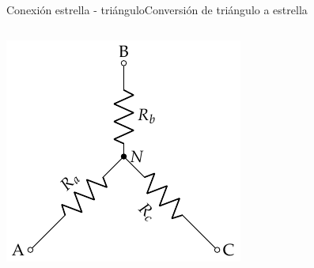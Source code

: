\documentclass[aspectratio=169, xcolor={usenames,svgnames,dvipsnames}]{beamer}
\begin{document}
\begin{frame}{Conexión estrella - triángulo}{Conversión de triángulo a estrella}
\begin{columns}
\begin{column}{0.3\columnwidth}
\begin{center}
\includegraphics[width=.9\linewidth]{../figs/Conexion_Estrella.pdf}
\end{center}
\end{column}
\end{columns}
\end{frame}
\end{document}
